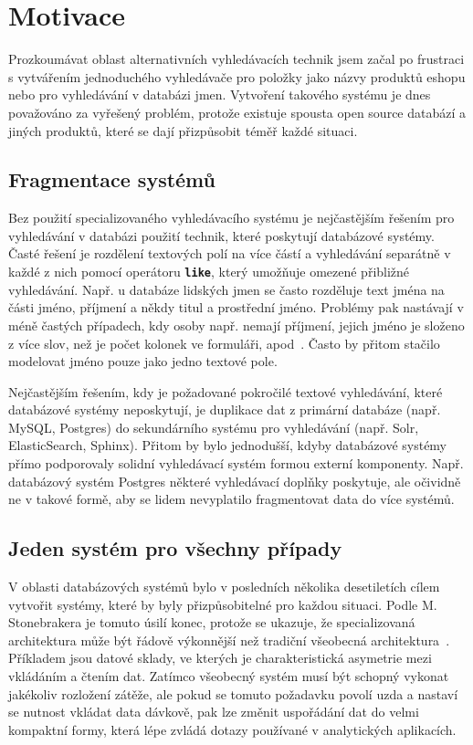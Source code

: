 \documentclass[11pt,letterpaper,oneside,openright]{book}
\newcommand{\bftt}[1]{\texttt{\textbf{#1}}}
\begin{document}
\section{Motivace}
Prozkoumávat oblast alternativních vyhledávacích technik jsem začal po
frustraci s vytvářením jednoduchého vyhledávače pro položky jako názvy produktů
eshopu nebo pro vyhledávání v databázi jmen. Vytvoření takového systému je dnes
považováno za vyřešený problém, protože existuje spousta open source databází a
jiných produktů, které se dají přizpůsobit téměř každé situaci.

\subsection{Fragmentace systémů}
Bez použití specializovaného vyhledávacího systému je nejčastějším řešením pro
vyhledávání v databázi použití technik, které poskytují databázové systémy.
Časté řešení je rozdělení textových polí na více částí a vyhledávání separátně
v každé z nich pomocí operátoru \bftt{like}, který umožňuje omezené přibližné
vyhledávání. Např. u databáze lidských jmen se často rozděluje text jména na části
jméno, příjmení a někdy titul a prostřední jméno. Problémy pak nastávají v méně
častých případech, kdy osoby např. nemají příjmení, jejich jméno je složeno z
více slov, než je počet kolonek ve formuláři, apod~\cite{name_falsehoods}.
Často by přitom stačilo modelovat jméno pouze jako jedno textové pole.

Nejčastějším řešením, kdy je požadované pokročilé textové vyhledávání, které
databázové systémy neposkytují, je duplikace dat z primární databáze (např.
MySQL, Postgres) do sekundárního systému pro vyhledávání (např. Solr,
ElasticSearch, Sphinx). Přitom by bylo jednodušší, kdyby databázové systémy
přímo podporovaly solidní vyhledávací systém formou externí komponenty. Např.
databázový systém Postgres některé vyhledávací doplňky poskytuje, ale očividně
ne v takové formě, aby se lidem nevyplatilo fragmentovat data do více systémů.


\subsection{Jeden systém pro všechny případy}
V oblasti databázových systémů bylo v posledních několika desetiletích cílem
vytvořit systémy, které by byly přizpůsobitelné pro každou situaci. Podle M.
Stonebrakera je tomuto úsilí konec, protože se ukazuje, že specializovaná
architektura může být řádově výkonnější než tradiční všeobecná
architektura~\cite{Stonebraker:2005:OSF:1053724.1054024}. Příkladem jsou datové
sklady, ve kterých je charakteristická asymetrie mezi vkládáním a čtením dat.
Zatímco všeobecný systém musí být schopný vykonat jakékoliv rozložení zátěže,
ale pokud se tomuto požadavku povolí uzda a nastaví se nutnost vkládat data
dávkově, pak lze změnit uspořádání dat do velmi kompaktní formy, která lépe
zvládá dotazy používané v analytických aplikacích.
\end{document}
